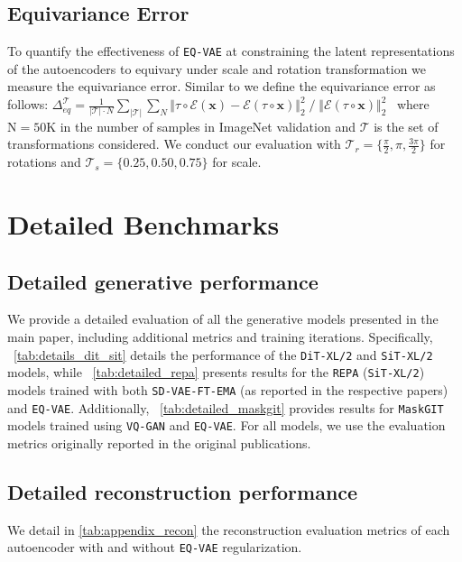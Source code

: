 \subsection{Equivariance Error} 
\label{sec:equi_error}

To quantify the effectiveness of \texttt{EQ-VAE} at constraining the latent representations of the autoencoders to equivary under scale and rotation transformation we measure the equivariance error. Similar to \cite{Sosnovik2020Scale-Equivariant} we define the equivariance error as follows: \mbox{$\Delta_{eq}^{\mathcal{T}} = \frac{1}{\vert \mathcal{T}\vert \cdot N}  \underset{\vert \mathcal{T} \vert}{\sum} \underset{N}{\sum} \Vert \tau \circ \mathcal{E}(\mathbf{x}) - \mathcal{E}(\tau \circ  \mathbf{x}) \Vert_2^2 \;/ \; 
 \Vert \mathcal{E}(\tau \circ \mathbf{x})\Vert_2^2$  } where $\text{N}=50\text{K}$ in the number of samples in ImageNet validation and $\mathcal{T}$ is the set of transformations considered. We conduct our evaluation with $\mathcal{T}_r=  \{ \frac{\pi}{2},\pi, \frac{3\pi}{2}\}$ for rotations and $\mathcal{T}_s=  \{ 0.25, 0.50, 0.75\}$ for scale.



\section{Detailed Benchmarks}

\subsection{Detailed generative performance}
We provide a detailed evaluation of all the generative models presented in the main paper, including additional metrics and training iterations.  
 Specifically, ~\autoref{tab:details_dit_sit} details the performance of the \texttt{DiT-XL/2} and \texttt{SiT-XL/2} models, while ~\autoref{tab:detailed_repa} presents results for the \texttt{REPA} (\texttt{SiT-XL/2}) models trained with both \texttt{SD-VAE-FT-EMA} (as reported in the respective papers) and \texttt{EQ-VAE}. Additionally, ~\autoref{tab:detailed_maskgit} provides results for \texttt{MaskGIT} models trained using \texttt{VQ-GAN} and \texttt{EQ-VAE}. For all models, we use the evaluation metrics originally reported in the original publications.


\newpage



\subsection{Detailed reconstruction performance}
We detail in \autoref{tab:appendix_recon} the reconstruction evaluation metrics of each autoencoder with and without \texttt{EQ-VAE} regularization.
\label{sec:autoencoders_appendix}

